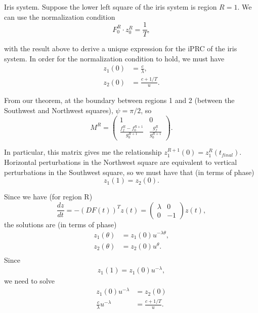\documentclass{beamer}
\renewcommand{\matrix}[2]{ \left(\begin{array}{#1} #2 \end{array}\right)}
\begin{document}
\begin{frame}
\frametitle{\insertsection}
\framesubtitle{\insertsubsection}
Iris system.  Suppose the lower left square of the iris system is region $R=1$.  We can use the normalization condition 
\begin{equation}\label{eq:normalization}
F_0^R\cdot z^R_0=\frac{1}{T},
\end{equation}

with the result above to derive a unique expression for the iPRC of the iris system.  In order for the normalization condition to hold, we must have
\begin{align}
 z_1(0) &= \frac{c}{\lambda},\\
 z_2(0) &= \frac{c+1/T}{u}.
\end{align}
\end{frame}

\begin{frame}
From our theorem, at the boundary between regions 1 and 2 (between the Southwest and Northwest squares), $\psi = \pi/2$, so
\begin{equation}
 M^R = \matrix{cc}{1 & 0\\ \frac{f_f^R-f_0^{R+1}}{g_0^{R+1}} & \frac{g_f^R}{g_0^{R+1}}}.
\end{equation}

In particular, this matrix gives me the relationship $z_1^{R+1}(0) = z_1^R(t_{final})$.  Horizontal perturbations in the Northwest square are equivalent to vertical perturbations in the Southwest square, so we must have that (in terms of phase)
\begin{equation}
 z_1(1) = z_2(0).
\end{equation}
\end{frame}

\begin{frame}

Since we have (for region R)
\begin{equation}
 \frac{dz}{dt} = -(DF(t))^T z(t) = \matrix{cc}{\lambda & 0\\ 0 & -1} z(t),
\end{equation}
the solutions are (in terms of phase)
\begin{equation}
\begin{split}
 z_1(\theta) &= z_1(0) u^{-\lambda \theta},\\
 z_2(\theta) &= z_2(0) u^{\theta}.\\
\end{split}
\end{equation}
Since
\begin{equation}
\begin{split}
 z_1(1) = z_1(0) u^{-\lambda},
\end{split}
\end{equation}
we need to solve
\begin{equation}
\begin{split}
  z_1(0)u^{-\lambda} &= z_2(0)\\
  \frac{c}{\lambda} u^{-\lambda} &= \frac{c+1/T}{u}.
\end{split}
\end{equation}


\end{frame}
\end{document}
